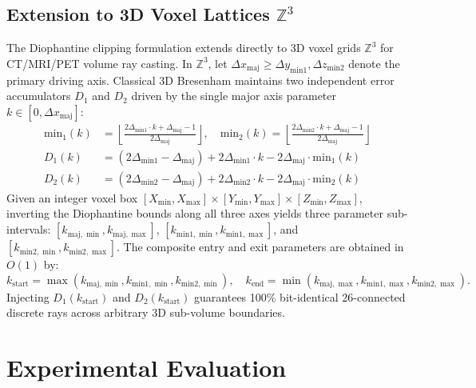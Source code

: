 \documentclass[runningheads]{llncs}
\begin{document}
\subsection{Extension to 3D Voxel Lattices $\mathbb{Z}^3$}
\label{sec:3d_extension}
The Diophantine clipping formulation extends directly to 3D voxel grids $\mathbb{Z}^3$ for CT/MRI/PET volume ray casting. In $\mathbb{Z}^3$, let $\Delta x_{\mathrm{maj}} \ge \Delta y_{\mathrm{min1}}, \Delta z_{\mathrm{min2}}$ denote the primary driving axis. Classical 3D Bresenham maintains two independent error accumulators $D_1$ and $D_2$ driven by the single major axis parameter $k \in [0, \Delta x_{\mathrm{maj}}]$:
\begin{align}
    \label{eq:3d_rel}
    \mathrm{min}_1(k) &= \left\lfloor \frac{2\Delta_{\mathrm{min1}} \cdot k + \Delta_{\mathrm{maj}} - 1}{2\Delta_{\mathrm{maj}}} \right\rfloor, \quad
    \mathrm{min}_2(k) = \left\lfloor \frac{2\Delta_{\mathrm{min2}} \cdot k + \Delta_{\mathrm{maj}} - 1}{2\Delta_{\mathrm{maj}}} \right\rfloor \\
    D_1(k) &= (2\Delta_{\mathrm{min1}} - \Delta_{\mathrm{maj}}) + 2\Delta_{\mathrm{min1}} \cdot k - 2\Delta_{\mathrm{maj}} \cdot \mathrm{min}_1(k) \\
    D_2(k) &= (2\Delta_{\mathrm{min2}} - \Delta_{\mathrm{maj}}) + 2\Delta_{\mathrm{min2}} \cdot k - 2\Delta_{\mathrm{maj}} \cdot \mathrm{min}_2(k)
\end{align}
Given an integer voxel box $[X_{\min}, X_{\max}] \times [Y_{\min}, Y_{\max}] \times [Z_{\min}, Z_{\max}]$, inverting the Diophantine bounds along all three axes yields three parameter sub-intervals: $[k_{\mathrm{maj},\min}, k_{\mathrm{maj},\max}]$, $[k_{\mathrm{min1},\min}, k_{\mathrm{min1},\max}]$, and $[k_{\mathrm{min2},\min}, k_{\mathrm{min2},\max}]$. 
The composite entry and exit parameters are obtained in $O(1)$ by:
\begin{equation}
    k_{\mathrm{start}} = \max(k_{\mathrm{maj},\min}, k_{\mathrm{min1},\min}, k_{\mathrm{min2},\min}), \quad
    k_{\mathrm{end}} = \min(k_{\mathrm{maj},\max}, k_{\mathrm{min1},\max}, k_{\mathrm{min2},\max}).
\end{equation}
Injecting $D_1(k_{\mathrm{start}})$ and $D_2(k_{\mathrm{start}})$ guarantees 100\% bit-identical 26-connected discrete rays across arbitrary 3D sub-volume boundaries.

\section{Experimental Evaluation}
\label{sec:experiments}
\end{document}
